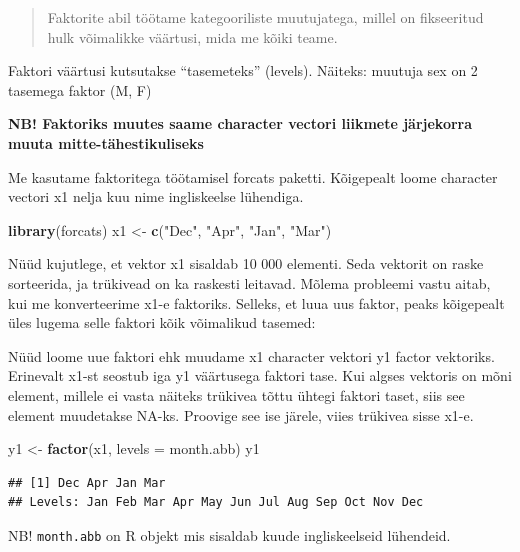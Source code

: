 \documentclass[]{book}
\newenvironment{Shaded}{\begin{snugshade}}{\end{snugshade}}
\newcommand{\KeywordTok}[1]{\textcolor[rgb]{0.13,0.29,0.53}{\textbf{#1}}}
\newcommand{\DataTypeTok}[1]{\textcolor[rgb]{0.13,0.29,0.53}{#1}}
\newcommand{\StringTok}[1]{\textcolor[rgb]{0.31,0.60,0.02}{#1}}
\newcommand{\NormalTok}[1]{#1}
\begin{document}
\begin{quote}
Faktorite abil töötame kategooriliste muutujatega, millel on fikseeritud
hulk võimalikke väärtusi, mida me kõiki teame.
\end{quote}

Faktori väärtusi kutsutakse ``tasemeteks'' (levels). Näiteks: muutuja
sex on 2 tasemega faktor (M, F)

\textbf{NB! Faktoriks muutes saame character vectori liikmete järjekorra
muuta mitte-tähestikuliseks}

Me kasutame faktoritega töötamisel forcats paketti. Kõigepealt loome
character vectori x1 nelja kuu nime ingliskeelse lühendiga.

\begin{Shaded}
\begin{Highlighting}[]
\KeywordTok{library}\NormalTok{(forcats)}
\NormalTok{x1 <-}\StringTok{ }\KeywordTok{c}\NormalTok{(}\StringTok{"Dec"}\NormalTok{, }\StringTok{"Apr"}\NormalTok{, }\StringTok{"Jan"}\NormalTok{, }\StringTok{"Mar"}\NormalTok{)}
\end{Highlighting}
\end{Shaded}

Nüüd kujutlege, et vektor x1 sisaldab 10 000 elementi. Seda vektorit on
raske sorteerida, ja trükivead on ka raskesti leitavad. Mõlema probleemi
vastu aitab, kui me konverteerime x1-e faktoriks. Selleks, et luua uus
faktor, peaks kõigepealt üles lugema selle faktori kõik võimalikud
tasemed:

Nüüd loome uue faktori ehk muudame x1 character vektori y1 factor
vektoriks. Erinevalt x1-st seostub iga y1 väärtusega faktori tase. Kui
algses vektoris on mõni element, millele ei vasta näiteks trükivea tõttu
ühtegi faktori taset, siis see element muudetakse NA-ks. Proovige see
ise järele, viies trükivea sisse x1-e.

\begin{Shaded}
\begin{Highlighting}[]
\NormalTok{y1 <-}\StringTok{ }\KeywordTok{factor}\NormalTok{(x1, }\DataTypeTok{levels =}\NormalTok{ month.abb)}
\NormalTok{y1}
\end{Highlighting}
\end{Shaded}

\begin{verbatim}
## [1] Dec Apr Jan Mar
## Levels: Jan Feb Mar Apr May Jun Jul Aug Sep Oct Nov Dec
\end{verbatim}

NB! \texttt{month.abb} on R objekt mis sisaldab kuude ingliskeelseid
lühendeid.
\end{document}
